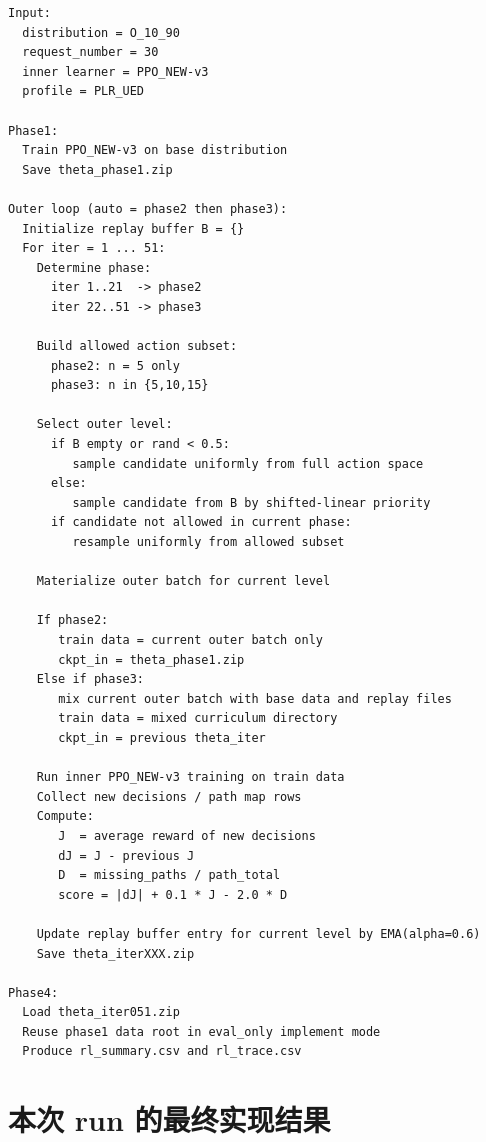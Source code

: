 \documentclass[11pt,a4paper]{ctexart}
\begin{document}
\begin{lstlisting}
Input:
  distribution = O_10_90
  request_number = 30
  inner learner = PPO_NEW-v3
  profile = PLR_UED

Phase1:
  Train PPO_NEW-v3 on base distribution
  Save theta_phase1.zip

Outer loop (auto = phase2 then phase3):
  Initialize replay buffer B = {}
  For iter = 1 ... 51:
    Determine phase:
      iter 1..21  -> phase2
      iter 22..51 -> phase3

    Build allowed action subset:
      phase2: n = 5 only
      phase3: n in {5,10,15}

    Select outer level:
      if B empty or rand < 0.5:
         sample candidate uniformly from full action space
      else:
         sample candidate from B by shifted-linear priority
      if candidate not allowed in current phase:
         resample uniformly from allowed subset

    Materialize outer batch for current level

    If phase2:
       train data = current outer batch only
       ckpt_in = theta_phase1.zip
    Else if phase3:
       mix current outer batch with base data and replay files
       train data = mixed curriculum directory
       ckpt_in = previous theta_iter

    Run inner PPO_NEW-v3 training on train data
    Collect new decisions / path map rows
    Compute:
       J  = average reward of new decisions
       dJ = J - previous J
       D  = missing_paths / path_total
       score = |dJ| + 0.1 * J - 2.0 * D

    Update replay buffer entry for current level by EMA(alpha=0.6)
    Save theta_iterXXX.zip

Phase4:
  Load theta_iter051.zip
  Reuse phase1 data root in eval_only implement mode
  Produce rl_summary.csv and rl_trace.csv
\end{lstlisting}

\section{本次 run 的最终实现结果}
\end{document}

